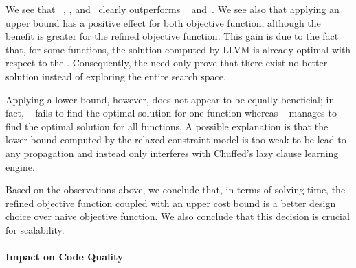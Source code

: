 We see that ~,
, and~ clearly
outperforms ~
and~.
%
We see also that applying an upper bound has a positive effect for both
\gls{objective function}, although the benefit is greater for the refined
\gls{objective function}.
%
This gain is due to the fact that, for some \glspl{function}, the \gls{solution}
computed by \gls{LLVM} is already optimal with respect to the
.
%
Consequently, the  need only prove that there exist
no better \gls{solution} instead of exploring the entire \gls{search space}.

Applying a lower bound, however, does not appear to be equally beneficial; in
fact, ~ fails to find
the optimal \gls{solution} for one \gls{function} whereas ~ manages to find the optimal
\gls{solution} for all \glspl{function}.
%
A possible explanation is that the lower bound computed by the relaxed
\gls{constraint model} is too weak to be lead to any \gls{propagation} and
instead only interferes with \gls{Chuffed}'s \gls{lazy clause learning} engine.

Based on the observations above, we conclude that, in terms of solving time, the
refined \gls{objective function} coupled with an upper cost bound is a better
design choice over naive \gls{objective function}.
%
We also conclude that this decision is crucial for scalability.


\paragraph{Impact on Code Quality}



